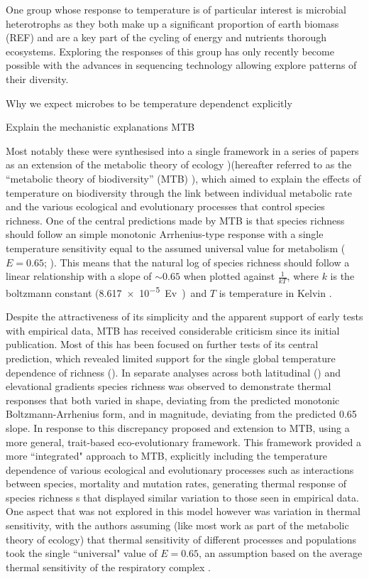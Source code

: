 \documentclass{article}
\begin{document}
One group whose response to temperature is of particular interest is microbial heterotrophs as they both make up a significant proportion of earth biomass (REF) and are a key part of the cycling of energy and nutrients thorough ecosystems. Exploring the responses of this group has only recently become possible with the advances in sequencing technology allowing explore patterns of their diversity. 




Why we expect microbes to be temperature dependenct explicitly 

Explain the mechanistic explanations 
 MTB
 
 
 Most notably these were synthesised into a single framework in a series of papers as an extension of the metabolic theory of ecology \citep{Allen2002,Allen2006,Gillooly2007})(hereafter referred to as the ``metabolic theory of biodiversity'' (MTB) \citep{Stegen2012}), which aimed to explain the effects of temperature on biodiversity through the link between individual metabolic rate and the various ecological and evolutionary processes that control species richness. One of the central predictions made by MTB is that species richness should follow an simple monotonic Arrhenius-type response with a single temperature sensitivity equal to the assumed universal value for metabolism ($E = 0.65$; \cite{Gillooly2001}). This means that the natural log of species richness should follow a linear relationship with a slope of $\sim 0.65$ when plotted against $\frac{1}{kT}$, where $k$ is the boltzmann constant (\SI{8.617e-5}Ev) and $T$ is temperature in Kelvin \citep{Allen2002}.

Despite the attractiveness of its simplicity and the apparent support of early tests with empirical data, MTB has received considerable criticism since its initial publication. Most of this has been focused on further tests of its central prediction, which revealed limited support for the single global temperature dependence of richness (\citep{Hawkins2007}). In separate analyses across both latitudinal (\citep{Hawkins2007,Algar2007}) and elevational \citep{McCain2010} gradients species richness was observed to demonstrate thermal responses that both varied in shape, deviating from the predicted monotonic Boltzmann-Arrhenius form, and in magnitude, deviating from the predicted 0.65 slope. In response to this discrepancy \citet{Stegen2012} proposed and extension to MTB, using a more general, trait-based eco-evolutionary framework. This framework provided a more ``integrated" approach to MTB, explicitly including the temperature dependence of various ecological and evolutionary processes such as interactions between species, mortality and mutation rates, generating thermal response of species richness s that displayed similar variation to those seen in empirical data. One aspect that was not explored in this model however was variation in thermal sensitivity, with the authors assuming (like most work as part of the metabolic theory of ecology) that thermal sensitivity of different processes and populations took the single ``universal" value of $E=0.65$, an assumption based on the average thermal sensitivity of the respiratory complex \citep{Gillooly2001,Brown2004}.
\end{document}

